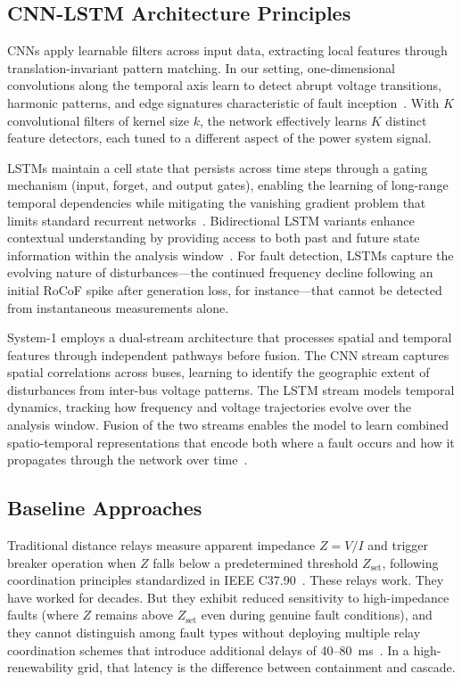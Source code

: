 \documentclass[journal]{IEEEtran}
\begin{document}
\subsection{CNN-LSTM Architecture Principles}

CNNs apply learnable filters across input data, extracting local features through translation-invariant pattern matching. In our setting, one-dimensional convolutions along the temporal axis learn to detect abrupt voltage transitions, harmonic patterns, and edge signatures characteristic of fault inception~\cite{ref9}. With $K$ convolutional filters of kernel size $k$, the network effectively learns $K$ distinct feature detectors, each tuned to a different aspect of the power system signal.

LSTMs maintain a cell state that persists across time steps through a gating mechanism (input, forget, and output gates), enabling the learning of long-range temporal dependencies while mitigating the vanishing gradient problem that limits standard recurrent networks~\cite{ref10}. Bidirectional LSTM variants enhance contextual understanding by providing access to both past and future state information within the analysis window~\cite{ref22}. For fault detection, LSTMs capture the evolving nature of disturbances---the continued frequency decline following an initial RoCoF spike after generation loss, for instance---that cannot be detected from instantaneous measurements alone.

System-1 employs a dual-stream architecture that processes spatial and temporal features through independent pathways before fusion. The CNN stream captures spatial correlations across buses, learning to identify the geographic extent of disturbances from inter-bus voltage patterns. The LSTM stream models temporal dynamics, tracking how frequency and voltage trajectories evolve over the analysis window. Fusion of the two streams enables the model to learn combined spatio-temporal representations that encode both where a fault occurs and how it propagates through the network over time~\cite{ref11}.

\subsection{Baseline Approaches}

Traditional distance relays measure apparent impedance $Z = V/I$ and trigger breaker operation when $Z$ falls below a predetermined threshold $Z_{\text{set}}$, following coordination principles standardized in IEEE C37.90~\cite{ref3}. These relays work. They have worked for decades. But they exhibit reduced sensitivity to high-impedance faults (where $Z$ remains above $Z_{\text{set}}$ even during genuine fault conditions), and they cannot distinguish among fault types without deploying multiple relay coordination schemes that introduce additional delays of 40--80~ms~\cite{ref23}. In a high-renewability grid, that latency is the difference between containment and cascade.
\end{document}
